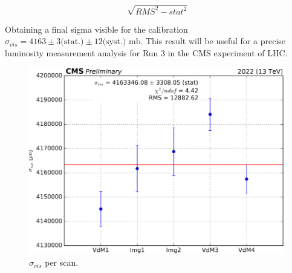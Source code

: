 \begin{equation}
\sqrt{RMS^{2}-stat^{2}}
\end{equation}

Obtaining a final sigma visible for the calibration $\sigma_{vis}=4163 \pm 3 \text{(stat.)} \pm 12 \text{(syst.)} \text{ mb}$. This result will be useful for a precise luminosity measurement analysis for Run 3 in the CMS experiment of LHC.

\begin{center}
  \begin{figure}[ht]
    \centering
    \includegraphics[scale=0.37]{Chapter4/xsec_perscan_v2.png}
    \caption[$\sigma_{vis}$ per Scan]{ $\sigma_{vis}$  per scan.} 
    \label{sigmavis_perscan}
  \end{figure}
\end{center}
